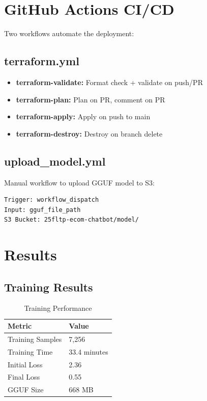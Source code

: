 \documentclass[12pt,a4paper]{article}
\begin{document}
\section{GitHub Actions CI/CD}
\label{sec:cicd}

Two workflows automate the deployment:

\subsection{terraform.yml}

\begin{itemize}
    \item \textbf{terraform-validate:} Format check + validate on push/PR
    \item \textbf{terraform-plan:} Plan on PR, comment on PR
    \item \textbf{terraform-apply:} Apply on push to main
    \item \textbf{terraform-destroy:} Destroy on branch delete
\end{itemize}

\subsection{upload\_model.yml}

Manual workflow to upload GGUF model to S3:
\begin{verbatim}
Trigger: workflow_dispatch
Input: gguf_file_path
S3 Bucket: 25fltp-ecom-chatbot/model/
\end{verbatim}

\section{Results}
\label{sec:results}

\subsection{Training Results}

\begin{table}[h!]
\centering
\caption{Training Performance}
\begin{tabular}{ll}
\toprule
Metric & Value \\
\midrule
Training Samples & 7,256 \\
Training Time & 33.4 minutes \\
Initial Loss & 2.36 \\
Final Loss & 0.55 \\
GGUF Size & 668 MB \\
\bottomrule
\end{tabular}
\end{table}
\end{document}
